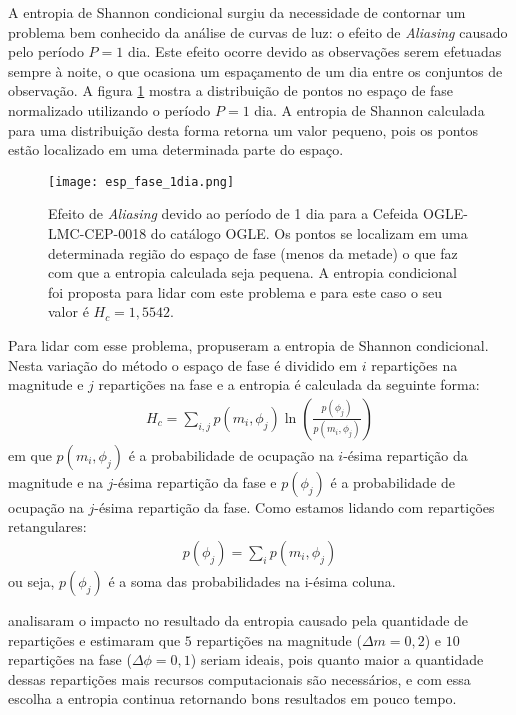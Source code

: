 A entropia de Shannon condicional surgiu da necessidade de contornar um problema bem conhecido da análise de curvas de luz: o efeito de \textit{Aliasing} causado pelo período $P=1$ dia. Este efeito ocorre devido as observações serem efetuadas sempre à noite, o que ocasiona um espaçamento de um dia entre os conjuntos de observação. A figura \ref{fig:periodo1dia} mostra a distribuição de pontos no espaço de fase normalizado utilizando o período $P=1$ dia. A entropia de Shannon calculada para uma distribuição desta forma retorna um valor pequeno, pois os pontos estão localizado em uma determinada parte do espaço.
\begin{figure}[!ht]
\centering
\texttt{[image: esp\_fase\_1dia.png]}
\caption[Efeito de \textit{Aliasing} com período de 1 dia.]{Efeito de \textit{Aliasing} devido ao período de 1 dia para a Cefeida OGLE-LMC-CEP-0018 do catálogo OGLE. Os pontos se localizam em uma determinada região do espaço de fase (menos da metade) o que faz com que a entropia calculada seja pequena. A entropia condicional foi proposta para lidar com este problema e para este caso o seu valor é $H_c=1,5542$.}
\label{fig:periodo1dia}
\end{figure}
Para lidar com esse problema, \citet{ce} propuseram a entropia de Shannon condicional. Nesta variação do método o espaço de fase é dividido em $i$ repartições na magnitude e $j$ repartições na fase e a entropia é calculada da seguinte forma:
\begin{align}
H_c = \sum_{i,j} p(m_i,\phi_j) \ln \left( \frac{p(\phi_j)}{p(m_i,\phi_j)} \right)
\end{align}
em que $p(m_i,\phi_j)$ é a probabilidade de ocupação na $i$-ésima repartição da magnitude e na $j$-ésima repartição da fase e $p(\phi_j)$ é a probabilidade de ocupação na $j$-ésima repartição da fase. Como estamos lidando com repartições retangulares:
\begin{align}
p(\phi_j) = \sum_i p(m_i,\phi_j)
\end{align}
ou seja, $p(\phi_j)$ é a soma das probabilidades na i-ésima coluna.

\citet{ce} analisaram o impacto no resultado da entropia causado pela quantidade de repartições e estimaram que $5$ repartições na magnitude ($\Delta m = 0,2$) e $10$ repartições na fase ($\Delta \phi = 0,1$) seriam ideais, pois quanto maior a quantidade dessas repartições mais recursos computacionais são necessários, e com essa escolha a entropia continua retornando bons resultados em pouco tempo.

